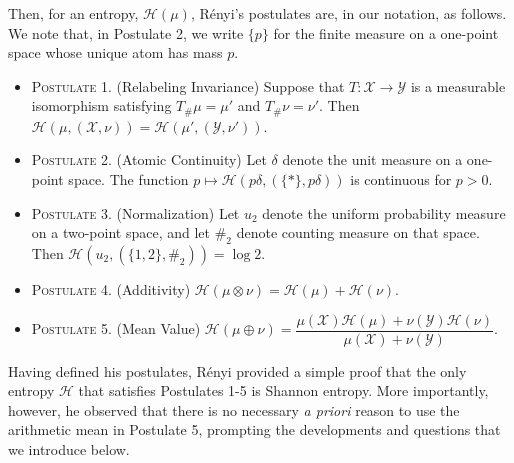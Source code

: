 \documentclass[reqno]{amsart}
\begin{document}
Then, for an entropy, $\mathcal{H}(\mu)$, Rényi's postulates are, in our notation, as follows. 
We note that, in Postulate 2,  we write $\{p\}$ for the finite measure on a one-point space whose unique atom has mass $p$.
\begin{itemize}
\item[] \textsc{Postulate 1.} (Relabeling Invariance) \quad
Suppose that $T:\mathcal X \rightarrow\mathcal Y$ is a measurable isomorphism satisfying $T_{\#}\mu=\mu'$ and  $T_{\#}\nu=\nu'$.
Then $
\mathcal H(\mu,(\mathcal X,\nu))
=
\mathcal H(\mu',(\mathcal Y,\nu'))$.

    \item[] \textsc{Postulate 2.} (Atomic Continuity) \quad
Let $\delta$ denote the unit measure on a one-point space. The function $p\mapsto
\mathcal H(p\delta,(\{\ast\},p\delta))$
is continuous for $p>0$.

   \item[] \textsc{Postulate 3.} (Normalization) \quad
Let $u_2$ denote the uniform probability measure on a two-point space,
and let $\#_2$ denote counting measure on that space. Then
$\mathcal H(u_2,(\{1,2\},\#_2))
=
\log 2$.
    
    \item[] \textsc{Postulate 4.} (Additivity) \quad $\mathcal{H}(\mu \otimes \nu) = \mathcal{H}(\mu) + \mathcal{H}(\nu)$.
    \item[] \textsc{Postulate 5.} (Mean Value) \quad $\mathcal{H}(\mu \oplus \nu) = \dfrac{\mu(\mathcal{X}) \mathcal{H}(\mu) + \nu(\mathcal{Y}) \mathcal{H}(\nu)}{\mu(\mathcal{X})+ \nu(\mathcal{Y})}$.
\end{itemize}


Having defined his postulates, Rényi provided a simple proof that the only entropy $\mathcal{H}$ that satisfies Postulates 1-5 is Shannon entropy. More importantly, however, he observed that there is no necessary \textit{a priori} reason to use the arithmetic mean in Postulate 5, prompting the developments and questions that we introduce below.  
\end{document}
